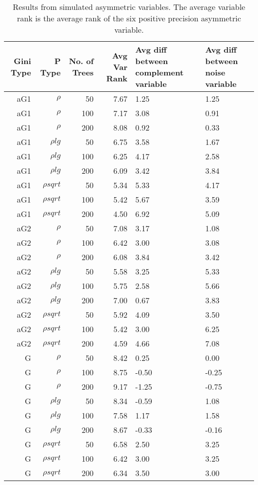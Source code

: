 \begin{table}%
  \centering
  \caption{Results from simulated asymmetric variables. The average variable rank is the average rank of the six positive precision asymmetric variable.}
\begin{tabular}{rrrrp{3cm}p{3cm}}
\hline
Gini Type & P Type & No. of Trees & Avg Var Rank & Avg diff between complement variable & Avg diff between noise variable \bigstrut\\
\hline
\renewcommand{\arraystretch}{.5}
aG1   & $\rho$ & 50    & 7.67  & 1.25  & 1.25 \bigstrut[t]\\
aG1   & $\rho$ & 100   & 7.17  & 3.08  & 0.91 \\
aG1   & $\rho$ & 200   & 8.08  & 0.92  & 0.33 \\
aG1   & $\rho{lg}$ & 50    & 6.75  & 3.58  & 1.67 \\
aG1   & $\rho{lg}$ & 100   & 6.25  & 4.17  & 2.58 \\
aG1   & $\rho{lg}$ & 200   & 6.09  & 3.42  & 3.84 \\
aG1   & $\rho{sqrt}$ & 50    & 5.34  & 5.33  & 4.17 \\
aG1   & $\rho{sqrt}$ & 100   & 5.42  & 5.67  & 3.59 \\
aG1   & $\rho{sqrt}$ & 200   & 4.50  & 6.92  & 5.09 \\
aG2   & $\rho$ & 50    & 7.08  & 3.17  & 1.08 \\
aG2   & $\rho$ & 100   & 6.42  & 3.00  & 3.08 \\
aG2   & $\rho$ & 200   & 6.08  & 3.84  & 3.42 \\
aG2   & $\rho{lg}$ & 50    & 5.58  & 3.25  & 5.33 \\
aG2   & $\rho{lg}$ & 100   & 5.75  & 2.58  & 5.66 \\
aG2   & $\rho{lg}$ & 200   & 7.00  & 0.67  & 3.83 \\
aG2   & $\rho{sqrt}$ & 50    & 5.92  & 4.09  & 3.50 \\
aG2   & $\rho{sqrt}$ & 100   & 5.42  & 3.00  & 6.25 \\
aG2   & $\rho{sqrt}$ & 200   & 4.59  & 4.66  & 7.08 \\
G     & $\rho$ & 50    & 8.42  & 0.25  & 0.00 \\
G     & $\rho$ & 100   & 8.75  & -0.50 & -0.25 \\
G     & $\rho$ & 200   & 9.17  & -1.25 & -0.75 \\
G     & $\rho{lg}$ & 50    & 8.34  & -0.59 & 1.08 \\
G     & $\rho{lg}$ & 100   & 7.58  & 1.17  & 1.58 \\
G     & $\rho{lg}$ & 200   & 8.67  & -0.33 & -0.16 \\
G     & $\rho{sqrt}$ & 50    & 6.58  & 2.50  & 3.25 \\
G     & $\rho{sqrt}$ & 100   & 6.42  & 3.00  & 3.25 \\
G     & $\rho{sqrt}$ & 200   & 6.34  & 3.50  & 3.00 \bigstrut[b]\\
\hline
\end{tabular}%
\label{tab:asymmetricfeaturesresults2}%
\end{table}%


